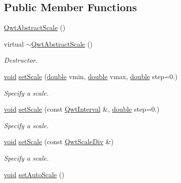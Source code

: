 \subsection*{Public Member Functions}
\begin{DoxyCompactItemize}
\item 
\hyperlink{class_qwt_abstract_scale_aa12aff84cebf3ace4f1b5e61737e0051}{Qwt\-Abstract\-Scale} ()
\item 
virtual \hyperlink{class_qwt_abstract_scale_a73890593efff11427ea7a42a3ebadefd}{$\sim$\-Qwt\-Abstract\-Scale} ()
\begin{DoxyCompactList}\small\item\em Destructor. \end{DoxyCompactList}\item 
\hyperlink{group___u_a_v_objects_plugin_ga444cf2ff3f0ecbe028adce838d373f5c}{void} \hyperlink{class_qwt_abstract_scale_a91af529248b556ef130add4bcfc60bb2}{set\-Scale} (\hyperlink{_super_l_u_support_8h_a8956b2b9f49bf918deed98379d159ca7}{double} vmin, \hyperlink{_super_l_u_support_8h_a8956b2b9f49bf918deed98379d159ca7}{double} vmax, \hyperlink{_super_l_u_support_8h_a8956b2b9f49bf918deed98379d159ca7}{double} step=0.)
\begin{DoxyCompactList}\small\item\em Specify a scale. \end{DoxyCompactList}\item 
\hyperlink{group___u_a_v_objects_plugin_ga444cf2ff3f0ecbe028adce838d373f5c}{void} \hyperlink{class_qwt_abstract_scale_a1e85d35fda2e18bad16e8aa43dbe99b4}{set\-Scale} (const \hyperlink{class_qwt_interval}{Qwt\-Interval} \&, \hyperlink{_super_l_u_support_8h_a8956b2b9f49bf918deed98379d159ca7}{double} step=0.)
\begin{DoxyCompactList}\small\item\em Specify a scale. \end{DoxyCompactList}\item 
\hyperlink{group___u_a_v_objects_plugin_ga444cf2ff3f0ecbe028adce838d373f5c}{void} \hyperlink{class_qwt_abstract_scale_ad002e1a352ecf85c1a8595a138d42db7}{set\-Scale} (const \hyperlink{class_qwt_scale_div}{Qwt\-Scale\-Div} \&)
\begin{DoxyCompactList}\small\item\em Specify a scale. \end{DoxyCompactList}\item 
\hyperlink{group___u_a_v_objects_plugin_ga444cf2ff3f0ecbe028adce838d373f5c}{void} \hyperlink{class_qwt_abstract_scale_ade952bd5cbde1dba015bc16b880e3a28}{set\-Auto\-Scale} ()

\end{DoxyCompactItemize}

